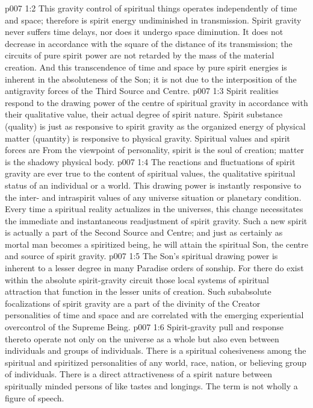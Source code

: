 \vs p007 1:2 This gravity control of spiritual things operates independently of time and space; therefore is spirit energy undiminished in transmission. Spirit gravity never suffers time delays, nor does it undergo space diminution. It does not decrease in accordance with the square of the distance of its transmission; the circuits of pure spirit power are not retarded by the mass of the material creation. And this transcendence of time and space by pure spirit energies is inherent in the absoluteness of the Son; it is not due to the interposition of the antigravity forces of the Third Source and Centre.
\vs p007 1:3 Spirit realities respond to the drawing power of the centre of spiritual gravity in accordance with their qualitative value, their actual degree of spirit nature. Spirit substance (quality) is just as responsive to spirit gravity as the organized energy of physical matter (quantity) is responsive to physical gravity. Spiritual values and spirit forces are  From the viewpoint of personality, spirit is the soul of creation; matter is the shadowy physical body.
\vs p007 1:4 The reactions and fluctuations of spirit gravity are ever true to the content of spiritual values, the qualitative spiritual status of an individual or a world. This drawing power is instantly responsive to the inter\hyp{} and intraspirit values of any universe situation or planetary condition. Every time a spiritual reality actualizes in the universes, this change necessitates the immediate and instantaneous readjustment of spirit gravity. Such a new spirit is actually a part of the Second Source and Centre; and just as certainly as mortal man becomes a spiritized being, he will attain the spiritual Son, the centre and source of spirit gravity.
\vs p007 1:5 \pc The Son’s spiritual drawing power is inherent to a lesser degree in many Paradise orders of sonship. For there do exist within the absolute spirit\hyp{}gravity circuit those local systems of spiritual attraction that function in the lesser units of creation. Such subabsolute focalizations of spirit gravity are a part of the divinity of the Creator personalities of time and space and are correlated with the emerging experiential overcontrol of the Supreme Being.
\vs p007 1:6 Spirit\hyp{}gravity pull and response thereto operate not only on the universe as a whole but also even between individuals and groups of individuals. There is a spiritual cohesiveness among the spiritual and spiritized personalities of any world, race, nation, or believing group of individuals. There is a direct attractiveness of a spirit nature between spiritually minded persons of like tastes and longings. The term  is not wholly a figure of speech.
